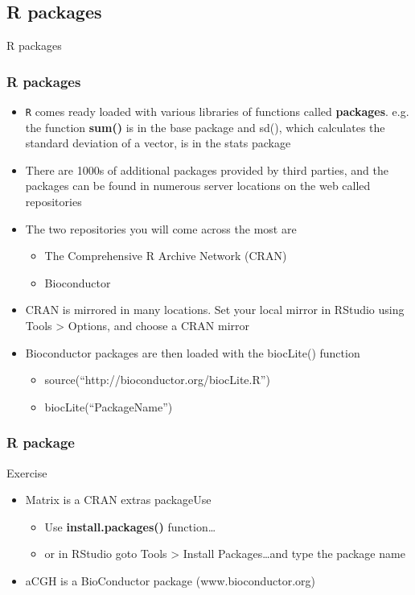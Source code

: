 \documentclass{beamer}
\begin{document}
\subsection{R packages}
\begin{frame}
	\centering \Huge R packages
\end{frame}

\begin{frame}[fragile]
	\frametitle{R packages}
	\begin{itemize}
	\small
		\item \texttt{R} comes ready loaded with various libraries of functions called \textbf{packages}. e.g. the function \textbf{sum()} is in the base package and sd(), which calculates the standard deviation of a vector, is in the stats package
	\pause
		\item There are 1000s of additional packages provided by third parties, and the packages can be found in numerous server locations on the web called repositories
	\pause
		\item The two repositories you will come across the most are
			\begin{itemize}
				\item The Comprehensive R Archive Network (CRAN)
				\item Bioconductor
			\end{itemize}
	\pause
		\item CRAN is mirrored in many locations. Set your local mirror in RStudio using Tools > Options, and choose a CRAN mirror
	\pause
		\item Bioconductor packages are then loaded with the biocLite() function
			\begin{itemize}
				\item source(``http://bioconductor.org/biocLite.R'')
				\item biocLite(``PackageName'')
			\end{itemize}
	\end{itemize}
\end{frame}

 
\begin{frame}[fragile]
	\frametitle{R package}
	\centering \Huge Exercise
	\begin{itemize}
	\small
		\item Matrix is a CRAN extras packageUse
			\begin{itemize}
				\item Use \textbf{install.packages()} function\ldots
				\item or in RStudio goto Tools > Install Packages\ldots and type the package name
			\end{itemize}
		\item aCGH is a BioConductor package (www.bioconductor.org)
	\end{itemize}
\end{frame}
\end{document}
